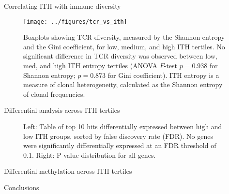 \documentclass[serif,mathserif,final,dvipsnames]{beamer}
\begin{document}
\begin{frame}{}
\begin{columns}[t]
    \begin{column}{0.32\linewidth}

      \begin{block}{Correlating ITH with immune diversity}
      \begin{figure}[htb]
          \centering
          \texttt{[image: ../figures/tcr\_vs\_ith]}
          \caption{Boxplots showing TCR diversity, measured by the Shannon entropy and the Gini coefficient, for low, medium, and high ITH tertiles. No significant difference in TCR diversity was observed between low, med, and high ITH entropy tertiles (ANOVA $F$-test $p=0.938$ for Shannon entropy; $p=0.873$ for Gini coefficient). ITH entropy is a measure of clonal heterogeneity, calculated as the Shannon entropy of clonal frequencies.}
        \end{figure}
      \end{block}

      \begin{block}{Differential analysis across ITH tertiles}
        \begin{figure}[htb]
          \centering
          \caption{Left: Table of top 10 hits differentially expressed between high and low ITH groups, sorted by false discovery rate (FDR). No genes were significantly differentially expressed at an FDR threshold of 0.1. Right: P-value distribution for all genes.}
        \end{figure}
      \end{block}

	\begin{block}{Differential methylation across ITH tertiles}
      \end{block}

      \begin{block}{Conclusions}
      \end{block}

    \end{column}%

  \end{columns}
\end{frame}
\end{document}

